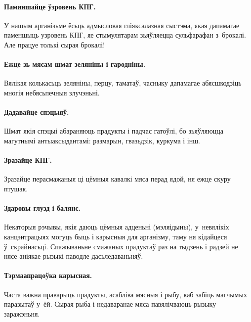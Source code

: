 \paragraph{Памяншайце ўзровень КПГ.}
У нашым арганізьме ёсьць адмысловая гліяксалазная сыстэма, якая дапамагае паменшыць узровень КПГ, яе стымулятарам зьяўляецца сульфарафан з~брокалі. Але працуе толькі сырая брокалі!

\paragraph{Ежце зь мясам шмат зеляніны і гародніны.}
Вялікая колькасьць зеляніны, перцу, таматаў, часныку дапамагае абясшкодзіць многія небясьпечныя злучэньні.


\paragraph{Дадавайце спэцыяў.}
Шмат якія спэцыі абараняюць прадукты і падчас гатоўлі, бо зьяўляюцца магутнымі антыаксыдантамі: размарын, гвазьдзік, куркума і інш.

\paragraph{Зразайце КПГ.}
Зразайце перасмажаныя ці цёмныя кавалкі мяса перад ядой, ня ежце скуру птушак.

\paragraph{Здаровы глузд і балянс.}
Некаторыя рэчывы, якія даюць цёмныя адценьні (мэляідыны), у~невялікіх канцэнтрацыях могуць быць і карысныя для арганізму, таму ня кідайцеся ў~скрайнасьці. Спажываньне смажаных прадуктаў раз на тыдзень і радзей не нясе аніякае рызыкі паводле дасьледаваньняў.

\paragraph{Тэрмаапрацоўка карысная.}
Часта важна праварыць прадукты, асабліва мясныя і рыбу, каб забіць магчымых паразытаў у~ёй. Сырая рыба і недаваранае мяса павялічваюць рызыку заражэньня.

